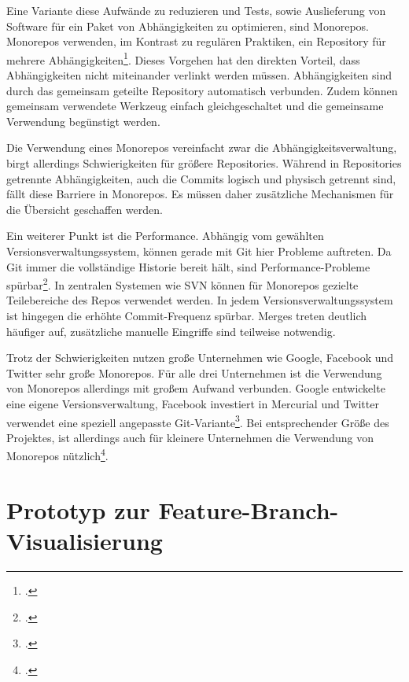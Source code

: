 Eine Variante diese Aufwände zu reduzieren und Tests, sowie Auslieferung von Software für ein Paket von Abhängigkeiten zu optimieren, sind Monorepos. Monorepos verwenden, im Kontrast zu regulären Praktiken, ein Repository für mehrere Abhängigkeiten\footcite{trunkbaseddevelopment-monorepo}. Dieses Vorgehen hat den direkten Vorteil, dass Abhängigkeiten nicht miteinander verlinkt werden müssen. Abhängigkeiten sind durch das gemeinsam geteilte Repository automatisch verbunden. Zudem können gemeinsam verwendete Werkzeug einfach gleichgeschaltet und die gemeinsame Verwendung begünstigt werden.

Die Verwendung eines Monorepos vereinfacht zwar die Abhängigkeitsverwaltung, birgt allerdings Schwierigkeiten für größere Repositories. Während in Repositories getrennte Abhängigkeiten, auch die Commits logisch und physisch getrennt sind, fällt diese Barriere in Monorepos. Es müssen daher zusätzliche Mechanismen für die Übersicht geschaffen werden.

Ein weiterer Punkt ist die Performance. Abhängig vom gewählten Versionsverwaltungssystem, können gerade mit Git hier Probleme auftreten. Da Git immer die vollständige Historie bereit hält, sind Performance-Probleme spürbar\footcite{atlassian-monorepo-git}. In zentralen Systemen wie SVN können für Monorepos gezielte Teilebereiche des Repos verwendet werden. 
In jedem Versionsverwaltungssystem ist hingegen die erhöhte Commit-Frequenz spürbar. Merges treten deutlich häufiger auf, zusätzliche manuelle Eingriffe sind teilweise notwendig.

Trotz der Schwierigkeiten nutzen große Unternehmen wie Google, Facebook und Twitter sehr große Monorepos. Für alle drei Unternehmen ist die Verwendung von Monorepos allerdings mit großem Aufwand verbunden. Google entwickelte eine eigene Versionsverwaltung, Facebook investiert in Mercurial und Twitter verwendet eine speziell angepasste Git-Variante\footcite{monorepos-wild}.
Bei entsprechender Größe des Projektes, ist allerdings auch für kleinere Unternehmen die Verwendung von Monorepos nützlich\footcite{hackernoon-positive-monorepo}.

\section{Prototyp zur Feature-Branch-Visualisierung}

